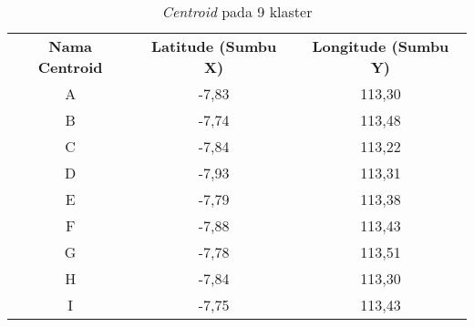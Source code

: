 \begin{table}[H]
\footnotesize
\centering
\begin{tabular}{ccc}
\rowcolor[HTML]{4472C4} 
{\color[HTML]{FFFFFF} \textbf{Nama   Centroid}} & {\color[HTML]{FFFFFF} \textbf{Latitude (Sumbu X)}} & {\color[HTML]{FFFFFF} \textbf{Longitude (Sumbu Y)}} \\
\rowcolor[HTML]{D9E1F2} 
A & -7,83 & 113,30 \\
B & -7,74 & 113,48 \\
\rowcolor[HTML]{D9E1F2} 
C & -7,84 & 113,22 \\
D & -7,93 & 113,31 \\
\rowcolor[HTML]{D9E1F2} 
E & -7,79 & 113,38 \\
F & -7,88 & 113,43 \\
\rowcolor[HTML]{D9E1F2} 
G & -7,78 & 113,51 \\
H & -7,84 & 113,30 \\
\rowcolor[HTML]{D9E1F2} 
I & -7,75 & 113,43 \\                        
\end{tabular}
\caption{\textit{Centroid} pada 9 klaster}
\label{tab:center9}
\end{table}